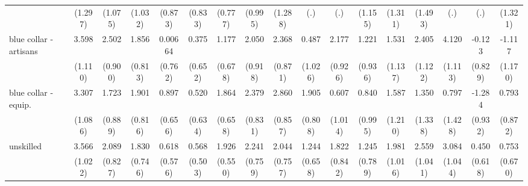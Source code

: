 {\begin{tabular}{l*{16}{c}}
                    &     (1.297)         &     (1.075)         &     (1.032)         &     (0.873)         &     (0.833)         &     (0.777)         &     (0.995)         &     (1.288)         &         (.)         &         (.)         &     (1.155)         &     (1.311)         &     (1.493)         &         (.)         &         (.)         &     (1.321)         \\
[1em]
blue collar - artisans&       3.598\sym{**} &       2.502\sym{**} &       1.856\sym{*}  &     0.00664         &       0.375         &       1.177         &       2.050\sym{*}  &       2.368\sym{**} &       0.487         &       2.177\sym{*}  &       1.221         &       1.531         &       2.405\sym{*}  &       4.120\sym{***}&      -0.123         &      -1.117         \\
                    &     (1.110)         &     (0.900)         &     (0.813)         &     (0.762)         &     (0.652)         &     (0.678)         &     (0.918)         &     (0.871)         &     (1.026)         &     (0.926)         &     (0.936)         &     (1.137)         &     (1.122)         &     (1.113)         &     (0.829)         &     (1.170)         \\
[1em]
blue collar - equip.&       3.307\sym{**} &       1.723         &       1.901\sym{*}  &       0.897         &       0.520         &       1.864\sym{**} &       2.379\sym{**} &       2.860\sym{***}&       1.905\sym{*}  &       0.607         &       0.840         &       1.587         &       1.350         &       0.797         &      -1.284         &       0.793         \\
                    &     (1.086)         &     (0.889)         &     (0.816)         &     (0.656)         &     (0.634)         &     (0.658)         &     (0.831)         &     (0.857)         &     (0.808)         &     (1.014)         &     (0.995)         &     (1.210)         &     (1.338)         &     (1.428)         &     (0.932)         &     (0.872)         \\
[1em]
unskilled           &       3.566\sym{***}&       2.089\sym{*}  &       1.830\sym{*}  &       0.618         &       0.568         &       1.926\sym{***}&       2.241\sym{**} &       2.044\sym{**} &       1.244         &       1.822\sym{*}  &       1.245         &       1.981         &       2.559\sym{*}  &       3.084\sym{**} &       0.450         &       0.753         \\
                    &     (1.022)         &     (0.827)         &     (0.746)         &     (0.576)         &     (0.503)         &     (0.550)         &     (0.759)         &     (0.757)         &     (0.658)         &     (0.842)         &     (0.789)         &     (1.016)         &     (1.041)         &     (1.044)         &     (0.618)         &     (0.670)         \\

\end{tabular}}
